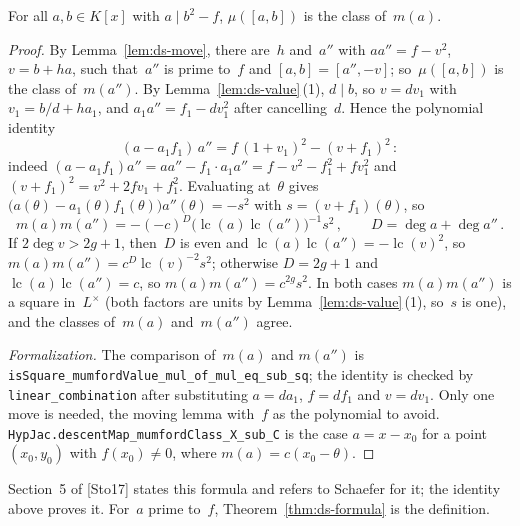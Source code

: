 \begin{theorem}
\label{thm:ds-formula}
\leanok
{}
For all $a, b \in K[x]$ with $a \mid b^2 - f$, $\mu([a, b])$ is the class of~$m(a)$.
\end{theorem}

\begin{proof}
\leanok
{}
By Lemma~\ref{lem:ds-move}, there are~$h$ and~$a''$ with $aa'' = f - v^2$, $v = b + ha$, such
that~$a''$ is prime to~$f$ and $[a, b] = [a'', -v]$; so~$\mu([a, b])$ is the class of~$m(a'')$.
By Lemma~\ref{lem:ds-value}\,(1), $d \mid b$, so $v = dv_1$ with $v_1 = b/d + ha_1$, and
$a_1a'' = f_1 - dv_1^2$ after cancelling~$d$. Hence the polynomial identity
\[ (a - a_1f_1)\,a'' = f\,(1 + v_1)^2 - (v + f_1)^2\,: \]
indeed $(a - a_1f_1)a'' = aa'' - f_1 \cdot a_1a'' = f - v^2 - f_1^2 + fv_1^2$ and
$(v + f_1)^2 = v^2 + 2fv_1 + f_1^2$. Evaluating at~$\theta$ gives
$\bigl(a(\theta) - a_1(\theta)f_1(\theta)\bigr)a''(\theta) = -s^2$ with $s = (v + f_1)(\theta)$,
so
\[ m(a)m(a'') = -(-c)^D\bigl(\operatorname{lc}(a)\operatorname{lc}(a'')\bigr)^{-1}s^2\,, \qquad
   D = \deg a + \deg a''\,. \]
If $2\deg v > 2g + 1$, then~$D$ is even and
$\operatorname{lc}(a)\operatorname{lc}(a'') = -\operatorname{lc}(v)^2$, so
$m(a)m(a'') = c^D\operatorname{lc}(v)^{-2}s^2$; otherwise $D = 2g + 1$ and
$\operatorname{lc}(a)\operatorname{lc}(a'') = c$, so $m(a)m(a'') = c^{2g}s^2$. In both cases
$m(a)m(a'')$ is a square in~$L^\times$ (both factors are units by
Lemma~\ref{lem:ds-value}\,(1), so~$s$ is one), and the classes of~$m(a)$ and~$m(a'')$ agree.

\emph{Formalization.} The comparison of~$m(a)$ and $m(a'')$ is
\texttt{isSquare\_mumfordValue\_mul\_of\_mul\_eq\_sub\_sq}; the identity is checked by
\texttt{linear\_combination} after substituting $a = da_1$, $f = df_1$ and $v = dv_1$. Only one
move is needed, the moving lemma with~$f$ as the polynomial to avoid.
\texttt{HypJac.descentMap\_mumfordClass\_X\_sub\_C} is the case $a = x - x_0$ for a point
$(x_0, y_0)$ with $f(x_0) \ne 0$, where $m(a) = c(x_0 - \theta)$.
\end{proof}

Section~5 of [Sto17] states this formula and refers to Schaefer for it; the identity above proves
it. For~$a$ prime to~$f$, Theorem~\ref{thm:ds-formula} is the definition.

